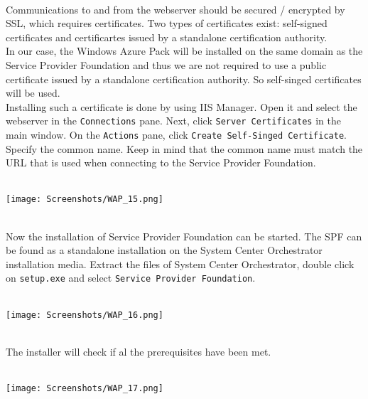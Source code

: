 $\;$ \\ \\
Communications to and from the webserver should be secured / encrypted by SSL, which requires certificates. Two types of certificates exist: self-signed certificates and certificartes issued by a standalone certification authority.  \\
In our case, the Windows Azure Pack will be installed on the same domain as the Service Provider Foundation and thus we are not required to use a public certificate issued by a standalone certification authority. So self-singed certificates will be used. \\
Installing such a certificate is done by using IIS Manager. Open it and select the webserver in the \texttt{Connections} pane. Next, click \texttt{Server Certificates} in the main window. On the \texttt{Actions} pane, click \texttt{Create Self-Singed Certificate}. \\
Specify the common name. Keep in mind that the common name must match the URL that is used when connecting to the Service Provider Foundation.
$\;$ \\ \\
\noindent\begin{minipage}{\textwidth}
    \centering
    \texttt{[image: Screenshots/WAP\_15.png]}
\end{minipage}
$\;$ \\ \\
Now the installation of Service Provider Foundation can be started. The SPF can be found as a standalone installation on the System Center Orchestrator installation media. Extract the files of System Center Orchestrator, double click on \texttt{setup.exe} and select \texttt{Service Provider Foundation}.
$\;$ \\ \\
\noindent\begin{minipage}{\textwidth}
    \centering
    \texttt{[image: Screenshots/WAP\_16.png]}
\end{minipage}
$\;$ \\ \\
The installer will check if al the prerequisites have been met.
$\;$ \\ \\
\noindent\begin{minipage}{\textwidth}
    \centering
    \texttt{[image: Screenshots/WAP\_17.png]}
\end{minipage}
